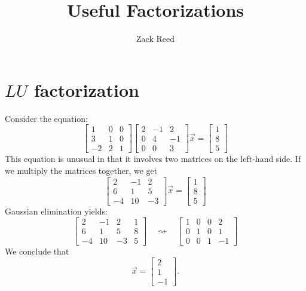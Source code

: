 \documentclass{ximera}
\author{Zack Reed}
\title{Useful Factorizations} \license{CC BY-NC-SA 4.0}
\begin{document}
\begin{abstract}

\end{abstract}
\maketitle
 

\section*{$LU$ factorization}

 
\begin{exploration}\label{init:LUfactorization}
Consider the equation:
$$\begin{bmatrix}1&0&0\\3&1&0\\-2&2&1\end{bmatrix}\begin{bmatrix}2&-1&2\\0&4&-1\\0&0&3\end{bmatrix}\vec{x}=\begin{bmatrix}1\\8\\5\end{bmatrix}$$
This equation is unusual in that it involves two matrices on the left-hand side.  If we multiply the matrices together, we get
$$\begin{bmatrix}2&-1&2\\6&1&5\\-4&10&-3\end{bmatrix}\vec{x}=\begin{bmatrix}1\\8\\5\end{bmatrix}$$
Gaussian elimination yields:
$$\left[\begin{array}{ccc|c}
2&-1&2&1\\6&1&5&8\\-4&10&-3&5
\end{array}\right]
\quad\rightsquigarrow\quad
\left[\begin{array}{ccc|c}
 1&0&0&2\\0&1&0&1\\0&0&1&-1
\end{array}\right]
$$
We conclude that
$$\vec{x}=\begin{bmatrix}2\\1\\-1\end{bmatrix}.$$
 

\end{exploration}
\end{document}
